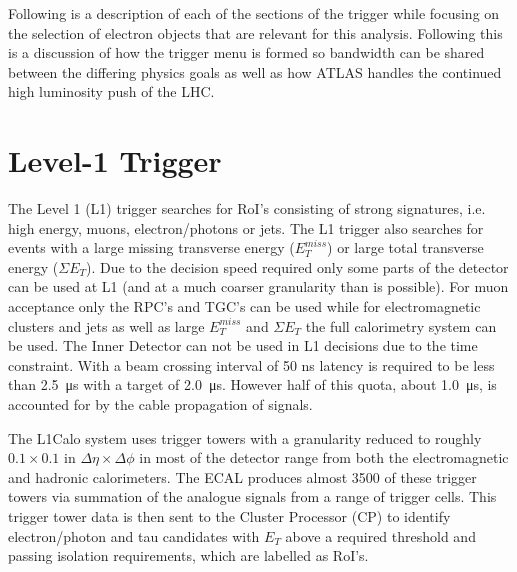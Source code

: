 	Following is a description of each of the sections of the trigger while focusing on the selection of electron objects that are relevant for this analysis. Following this is a discussion of how the trigger menu is formed so bandwidth can be shared between the differing physics goals as well as how ATLAS handles the continued high luminosity push of the LHC.


\section{Level-1 Trigger}

	The Level 1 (L1) trigger searches for RoI's consisting of strong signatures, i.e. high energy, muons, electron/photons or jets. The L1 trigger also searches for events with a large missing transverse energy ($E^{miss}_{T}$) or large total transverse energy ($\Sigma E_{T}$). Due to the decision speed required only some parts of the detector can be used at L1 (and at a much coarser granularity than is possible). For muon acceptance only the RPC's and TGC's can be used while for electromagnetic clusters and jets as well as large $E^{miss}_{T}$ and $\Sigma E_{T}$ the full calorimetry system can be used. The Inner Detector can not be used in L1 decisions due to the time constraint. With a beam crossing interval of 50 ns latency is required to be less than \SI{2.5}{\us} with a target of \SI{2.0}{\us}. However half of this quota, about \SI{1.0}{\us}, is accounted for by the cable propagation of signals.


	The L1Calo system uses trigger towers with a granularity reduced to roughly $0.1 \times 0.1$ in $\Delta\eta \times \Delta\phi$ in most of the detector range from both the electromagnetic and hadronic calorimeters. The ECAL produces almost 3500 of these trigger towers via summation of the analogue signals from a range of trigger cells. This trigger tower data is then sent to the Cluster Processor (CP) to identify electron/photon and tau candidates with $E_{T}$ above a required threshold and passing isolation requirements, which are labelled as RoI's.

